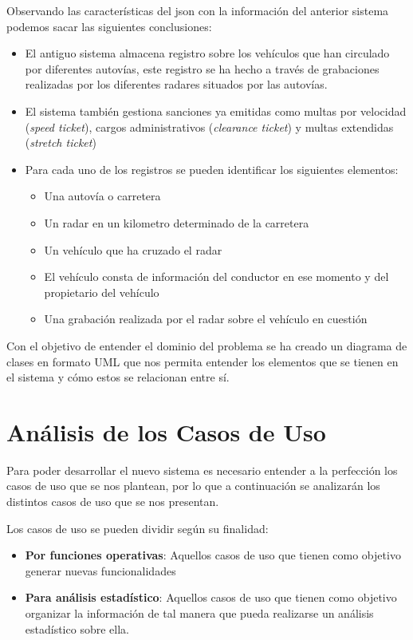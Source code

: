 \documentclass[]{article}
\begin{document}
Observando las características del json con la información del anterior sistema podemos sacar las siguientes conclusiones:
\begin{itemize}
    \item El antiguo sistema almacena registro sobre los vehículos que han circulado por diferentes autovías, este registro se ha hecho a través de grabaciones realizadas por los diferentes radares situados por las autovías.
    \item El sistema también gestiona sanciones ya emitidas como multas por velocidad (\textit{speed ticket}), cargos administrativos (\textit{clearance ticket}) y multas extendidas (\textit{stretch ticket})
    \item Para cada uno de los registros se pueden identificar los siguientes elementos:
    \begin{itemize}
        \item Una autovía o carretera
        \item Un radar en un kilometro determinado de la carretera
        \item Un vehículo que ha cruzado el radar
        \item El vehículo consta de información del conductor en ese momento y del propietario del vehículo
        \item Una grabación realizada por el radar sobre el vehículo en cuestión
    \end{itemize} 
\end{itemize}

Con el objetivo de entender el dominio del problema se ha creado un diagrama de clases en formato UML que nos permita entender los elementos que se tienen en el sistema y cómo estos se relacionan entre sí.

\section{Análisis de los Casos de Uso}
\label{sec:analisis_casos_de_uso}

Para poder desarrollar el nuevo sistema es necesario entender a la perfección los casos de uso que se nos plantean, por lo que a continuación se analizarán los distintos casos de uso que se nos presentan.

Los casos de uso se pueden dividir según su finalidad:
\begin{itemize}
    \item \textbf{Por funciones operativas}: Aquellos casos de uso que tienen como objetivo generar nuevas funcionalidades
    \item \textbf{Para análisis estadístico}: Aquellos casos de uso que tienen como objetivo organizar la información de tal manera que pueda realizarse un análisis estadístico sobre ella.
\end{itemize}
\end{document}
